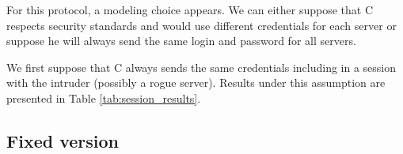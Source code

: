 For this protocol, a modeling choice appears.
We can either suppose that C respects security standards and would use different
credentials for each server or suppose he will always send the same login and
password for all servers.

We first suppose that C always sends the same credentials including in a session
with the intruder (possibly a rogue server).
Results under this assumption are presented in Table \ref{tab:session_results}.

\begin{table}[htb]
    \centering
    \caption{Results for  sub-protocol}
    \label{tab:session_results}
\end{table}

\subsection{Fixed version}

